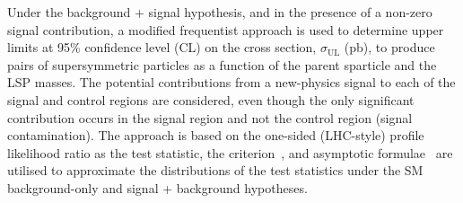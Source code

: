 Under the background + signal hypothesis, and in the presence of a
non-zero signal contribution, a modified frequentist approach is used
to determine upper limits at 95\% confidence level (CL) on the cross
section, $\sigma_\text{UL}$ (pb), to produce pairs of supersymmetric
particles as a function of the parent sparticle and the LSP
masses. The potential contributions from a new-physics signal to each
of the signal and control regions are considered, even though the only
significant contribution occurs in the signal region and not the
control region (\ie signal contamination). The approach is based on
the one-sided (LHC-style) profile likelihood ratio as the test
statistic, the \cls criterion~\cite{junk, read}, and asymptotic
formulae~\cite{Cowan:2010js} are utilised to approximate the
distributions of the test statistics under the SM background-only and
signal + background hypotheses.

